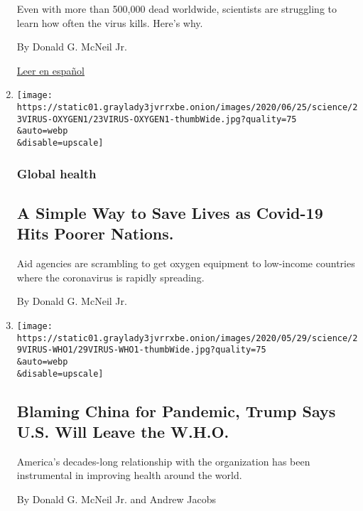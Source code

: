 \begin{enumerate}
  Even with more than 500,000 dead worldwide, scientists are struggling
  to learn how often the virus kills. Here's why.

  By Donald G. McNeil Jr.

  \href{https://www.nytimes3xbfgragh.onion/es/2020/07/06/espanol/tasa-mortalidad-fatalidad-coronavirus.html}{Leer
  en español}
\item
  \href{/2020/06/23/health/coronavirus-oxygen-africa.html}{}

  \texttt{[image: https://static01.graylady3jvrrxbe.onion/images/2020/06/25/science/23VIRUS-OXYGEN1/23VIRUS-OXYGEN1-thumbWide.jpg?quality=75\\\&auto=webp\\\&disable=upscale]}

  \hypertarget{global-health}{%
  \subsubsection{Global health}\label{global-health}}

  \hypertarget{a-simple-way-to-save-lives-as-covid-19-hits-poorer-nations}{%
  \subsection{A Simple Way to Save Lives as Covid-19 Hits Poorer
  Nations.}\label{a-simple-way-to-save-lives-as-covid-19-hits-poorer-nations}}

  Aid agencies are scrambling to get oxygen equipment to low-income
  countries where the coronavirus is rapidly spreading.

  By Donald G. McNeil Jr.
\item
  \href{/2020/05/29/health/virus-who.html}{}

  \texttt{[image: https://static01.graylady3jvrrxbe.onion/images/2020/05/29/science/29VIRUS-WHO1/29VIRUS-WHO1-thumbWide.jpg?quality=75\\\&auto=webp\\\&disable=upscale]}

  \hypertarget{blaming-china-for-pandemic-trump-says-us-will-leave-the-who}{%
  \subsection{Blaming China for Pandemic, Trump Says U.S. Will Leave the
  W.H.O.}\label{blaming-china-for-pandemic-trump-says-us-will-leave-the-who}}

  America's decades-long relationship with the organization has been
  instrumental in improving health around the world.

  By Donald G. McNeil Jr. and Andrew Jacobs
\end{enumerate}

